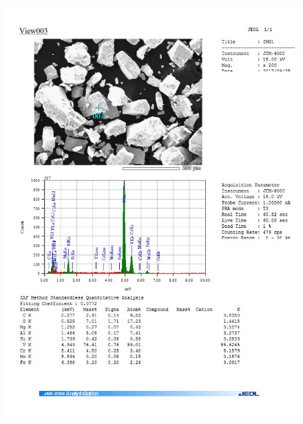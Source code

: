 \documentclass[12pt]{article}
\begin{document}
\begin{figure}[H]
	\includegraphics[width = \linewidth]{./pictures/dot_spec_7.jpg}
\end{figure}
\end{document}
